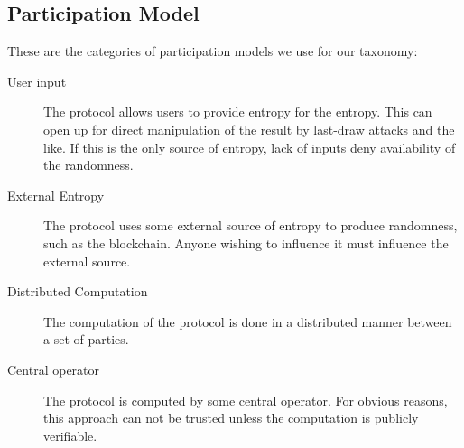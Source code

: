 \subsection{Participation Model}
\label{sub:participation_model}
These are the categories of participation models we use for our taxonomy: 

\begin{description}
    \item [User input] The protocol allows users to provide entropy for the entropy. This can open up for direct manipulation of the result by last-draw attacks and the like. If this is the only source of entropy, lack of inputs deny availability of the randomness.  
    \item [External Entropy] The protocol uses some external source of entropy to produce randomness, such as the blockchain. Anyone wishing to influence it must influence the external source. 
    \item [Distributed Computation]
    The computation of the protocol is done in a distributed manner between a set of parties. 
    \item [Central operator] The protocol is computed by some central operator. For obvious reasons, this approach can not be trusted unless the computation is publicly verifiable. 
\end{description}

